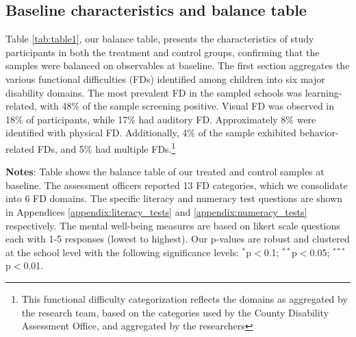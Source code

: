 \documentclass[hidelinks,12pt]{article}
\begin{document}
\begin{singlespace}
\subsection{Baseline characteristics and balance table}\label{subsec:background}
Table \ref{tab:table1}, our balance table, presents the characteristics of study participants in both the treatment and control groups, confirming that the samples were balanced on observables at baseline. The first section aggregates the various functional difficulties (FDs) identified among children into six major disability domains. The most prevalent FD in the sampled schools was learning-related, with 48\% of the sample screening positive. Visual FD was observed in 18\% of participants, while 17\% had auditory FD. Approximately 8\% were identified with physical FD. Additionally, 4\% of the sample exhibited behavior-related FDs, and 5\% had multiple FDs.\footnote{This functional difficulty categorization reflects the domains as aggregated by the research team, based on the categories used by the County Disability Assessment Office, and aggregated by the researchers}  
\begingroup
\setlength{\tabcolsep}{2pt}  %
\begin{table}[h!]
   \begin{singlespace}
    \centering
    \fontsize{10pt}{9pt}\selectfont  %
    \begin{threeparttable}
            
        \begin{tablenotes}
             \small %
            \textbf{Notes}:  Table shows the balance table of our treated and control samples at baseline. The assessment officers reported 13 FD categories, which we consolidate into 6 FD domains. The specific literacy and numeracy test questions are shown in Appendices \ref{appendix:literacy_tests} and \ref{appendix:numeracy_tests} respectively. The mental well-being measures are based on likert scale questions each with 1-5 responses (lowest to highest). Our p-values are robust and clustered at the school level with the following significance levels: {$^{*}$p$<$0.1; $^{**}$p$<$0.05; $^{***}$p$<$0.01}.
        \end{tablenotes}
    \end{threeparttable}
    \end{singlespace}
\end{table}
\endgroup


\end{singlespace}
\end{document}
